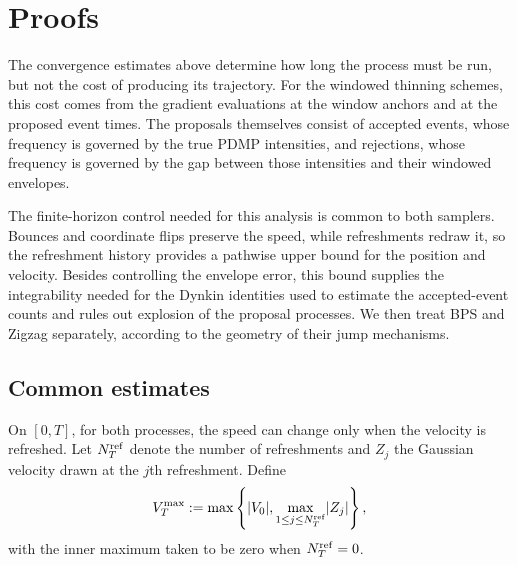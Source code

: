 \documentclass{amsart}
\theoremstyle{plain}
\theoremstyle{definition}
\theoremstyle{remark}
\newcommand{\abs}[1]{\lvert#1\rvert}
\newcommand{\1}{\mathbf 1}
\begin{document}
\section{Proofs}\label{sec:proof}

The convergence estimates above determine how long the process must be run,
but not the cost of producing its trajectory.  For the windowed thinning
schemes, this cost comes from the gradient evaluations at the window anchors
and at the proposed event times.  The proposals themselves consist of
accepted events, whose frequency is governed by the true PDMP intensities,
and rejections, whose frequency is governed by the gap between those
intensities and their windowed envelopes.

The finite-horizon control needed for this analysis is common to both
samplers.  Bounces and coordinate flips preserve the speed, while
refreshments redraw it, so the refreshment history provides a pathwise
upper bound for the position and velocity.  Besides controlling the envelope
error, this bound supplies the integrability needed for the Dynkin identities
used to estimate the accepted-event counts and rules out explosion of the
proposal processes.  We then treat BPS and Zigzag separately, according to
the geometry of their jump mechanisms.  

\subsection{Common estimates}\label{ssec:common-estimates}

On $[0,T]$, for both processes, the speed can change only when the velocity is refreshed.  Let
$N_T^{\rm ref}$ denote the number of refreshments and $Z_j$ the Gaussian
velocity drawn at the $j$th refreshment.  Define
\[
        V_T^{\max}:=\max\left\{\abs{V_0},
                    \max_{1\le j\le N_T^{\rm ref}}\abs{Z_j}\right\},
\]
with the inner maximum taken to be zero when $N_T^{\rm ref}=0$.
\end{document}
